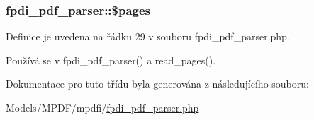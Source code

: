 \hypertarget{classfpdi__pdf__parser_a36999177da67b9cf4f971d23fcef69d5}{
\subsubsection[{\$pages}]{\setlength{\rightskip}{0pt plus 5cm}fpdi\-\_\-pdf\-\_\-parser\-::\$pages}}\label{classfpdi__pdf__parser_a36999177da67b9cf4f971d23fcef69d5}


Definice je uvedena na řádku 29 v souboru fpdi\-\_\-pdf\-\_\-parser.\-php.



Používá se v fpdi\-\_\-pdf\-\_\-parser() a read\-\_\-pages().



Dokumentace pro tuto třídu byla generována z následujícího souboru\-:\begin{DoxyCompactItemize}
\item 
Models/\-M\-P\-D\-F/mpdfi/\hyperlink{fpdi__pdf__parser_8php}{fpdi\-\_\-pdf\-\_\-parser.\-php}\end{DoxyCompactItemize}
